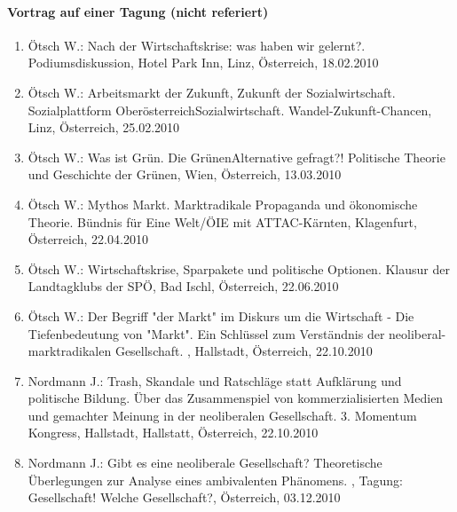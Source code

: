     \paragraph{Vortrag auf einer Tagung (nicht referiert)}
\begin{enumerate}
	\item Ötsch W.: Nach der Wirtschaftskrise: was haben wir gelernt?. Podiumsdiskussion, Hotel Park Inn, Linz, Österreich, 18.02.2010
	\item Ötsch W.: Arbeitsmarkt der Zukunft, Zukunft der Sozialwirtschaft. Sozialplattform OberösterreichSozialwirtschaft. Wandel-Zukunft-Chancen, Linz, Österreich, 25.02.2010
	\item Ötsch W.: Was ist Grün. Die GrünenAlternative gefragt?! Politische Theorie und Geschichte der Grünen, Wien, Österreich, 13.03.2010
	\item Ötsch W.: Mythos Markt. Marktradikale Propaganda und ökonomische Theorie. Bündnis für Eine Welt/ÖIE mit ATTAC-Kärnten, Klagenfurt, Österreich, 22.04.2010
	\item Ötsch W.: Wirtschaftskrise, Sparpakete und politische Optionen. Klausur der Landtagklubs der SPÖ, Bad Ischl, Österreich, 22.06.2010
	\item Ötsch W.: Der Begriff "der Markt" im Diskurs um die Wirtschaft - Die Tiefenbedeutung von "Markt". Ein Schlüssel zum Verständnis der neoliberal-marktradikalen Gesellschaft. , Hallstadt, Österreich, 22.10.2010
	\item Nordmann J.: Trash, Skandale und Ratschläge statt Aufklärung und politische Bildung. Über das Zusammenspiel von kommerzialisierten Medien und gemachter Meinung in der neoliberalen Gesellschaft. 3. Momentum Kongress, Hallstadt, Hallstatt, Österreich, 22.10.2010
	\item Nordmann J.: Gibt es eine neoliberale Gesellschaft? Theoretische Überlegungen zur Analyse eines ambivalenten Phänomens. , Tagung: Gesellschaft! Welche Gesellschaft?, Österreich, 03.12.2010
\end{enumerate}
